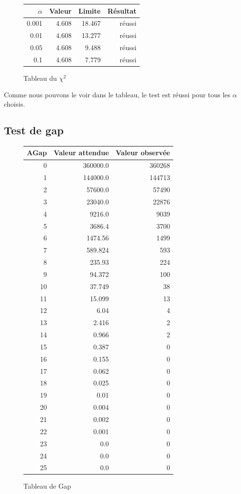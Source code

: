 \documentclass[10pt,a4paper]{article}
\begin{document}
	\begin{figure}[h]
		\centering
		\begin{tabular}{|r|r|r|r|}
			\hline
			$\alpha$ & Valeur & Limite & Résultat\\
			\hline
			0.001 & 4.608 & 18.467 & réussi\\
			0.01 & 4.608 & 13.277 & réussi\\
			0.05 & 4.608 & 9.488 & réussi\\
			0.1 & 4.608 & 7.779 & réussi\\
			\hline
		\end{tabular}
		\caption{Tableau du $\chi^2$}
	\end{figure}
	
	Comme nous pouvons le voir dans le tableau, le test est réussi pour tous les $\alpha$ choisis.
	
	
	
\newpage
\subsection{Test de gap}
	
	
\begin{figure}[h]
\centering
\begin{tabular}{|r|r|r|}
\hline
AGap & Valeur attendue & Valeur observée\\
\hline
0 & 360000.0 & 360268\\
1 & 144000.0 & 144713\\
2 & 57600.0 & 57490\\
3 & 23040.0 & 22876\\
4 & 9216.0 & 9039\\
5 & 3686.4 & 3700\\
6 & 1474.56 & 1499\\
7 & 589.824 & 593\\
8 & 235.93 & 224\\
9 & 94.372 & 100\\
10 & 37.749 & 38\\
11 & 15.099 & 13\\
12 & 6.04 & 4\\
13 & 2.416 & 2\\
14 & 0.966 & 2\\
15 & 0.387 & 0\\
16 & 0.155 & 0\\
17 & 0.062 & 0\\
18 & 0.025 & 0\\
19 & 0.01 & 0\\
20 & 0.004 & 0\\
21 & 0.002 & 0\\
22 & 0.001 & 0\\
23 & 0.0 & 0\\
24 & 0.0 & 0\\
25 & 0.0 & 0\\
\hline
\end{tabular}
\caption{Tableau de Gap}
\end{figure}
\end{document}
